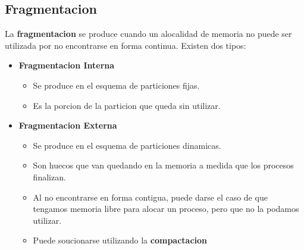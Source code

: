 \subsection{Fragmentacion}
La \textbf{fragmentacion} se produce cuando un alocalidad de memoria no puede ser utilizada por no encontrarse en forma continua.
Existen dos tipos:
\begin{itemize}
    \item \textbf{Fragmentacion Interna}
    \begin{itemize}
        \item Se produce en el esquema de particiones fijas.
        \item Es la porcion de la particion que queda sin utilizar.
    \end{itemize}
    \item \textbf{Fragmentacion Externa}
    \begin{itemize}
        \item Se produce en el esquema de particiones dinamicas.
        \item Son huecos que van quedando en la memoria a medida que los procesos finalizan.
        \item Al no encontrarse en forma contigua, puede darse el caso de que tengamos memoria libre para alocar un proceso, pero que no la podamos utilizar.
        \item Puede soucionarse utilizando la \textbf{compactacion}
    \end{itemize}
\end{itemize}

